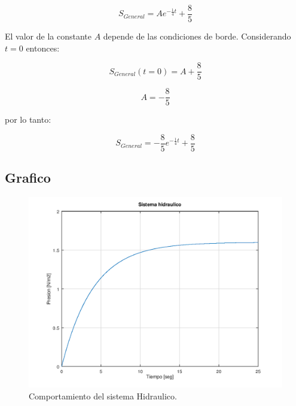 \documentclass[a4paper,12pt]{article}
\begin{document}
\begin{equation}
S_{General}=A e^{-\frac{1}{4}t} + \frac{8}{5}
\end{equation}

\vspace*{0.2in}
El valor de la constante $A$ depende de las condiciones de borde. Considerando $t=0$ entonces:

\begin{equation}
S_{General}(t=0)= A + \frac{8}{5}
\end{equation}

\begin{equation}
A=-\frac{8}{5}
\end{equation}

por lo tanto:\par

\begin{equation}
S_{General}=-\frac{8}{5}e^{-\frac{1}{4}t} +\frac{8}{5}
\end{equation}

\subsection{Grafico}

\vspace*{0.3in}

\begin{figure}[H]
\begin{center}
\includegraphics[width = 400pt]{imagenes/termotanqueHidraulico.png}
\caption{\small Comportamiento del sistema Hidraulico.}
\label{red}
\end{center}
\end{figure}
\end{document}
